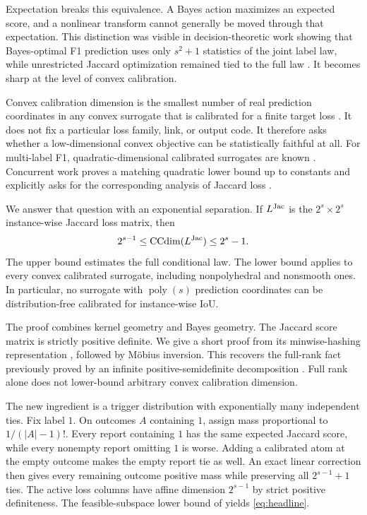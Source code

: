 \documentclass[twoside]{article}
\newcommand{\CCdim}{\operatorname{CCdim}}
\newcommand{\1}{\mathbf 1}
\begin{document}
Expectation breaks this equivalence. A Bayes action maximizes an expected score, and a nonlinear transform cannot generally be moved through that expectation. This distinction was visible in decision-theoretic work showing that Bayes-optimal F1 prediction uses only $s^2+1$ statistics of the joint label law, while unrestricted Jaccard optimization remained tied to the full law \citep{waegeman2014bayes}. It becomes sharp at the level of convex calibration.

Convex calibration dimension is the smallest number of real prediction coordinates in any convex surrogate that is calibrated for a finite target loss \citep{ramaswamy2016convex}. It does not fix a particular loss family, link, or output code. It therefore asks whether a low-dimensional convex objective can be statistically faithful at all. For multi-label F1, quadratic-dimensional calibrated surrogates are known \citep{zhang2020convex}. Concurrent work proves a matching quadratic lower bound up to constants and explicitly asks for the corresponding analysis of Jaccard loss \citep{zhang2026exact}.

We answer that question with an exponential separation. If $L^{\rm Jac}$ is the $2^s\times2^s$ instance-wise Jaccard loss matrix, then
\begin{equation}
2^{s-1}\leq\CCdim(L^{\rm Jac})\leq2^s-1.
\label{eq:headline}
\end{equation}
The upper bound estimates the full conditional law. The lower bound applies to every convex calibrated surrogate, including nonpolyhedral and nonsmooth ones. In particular, no surrogate with $\operatorname{poly}(s)$ prediction coordinates can be distribution-free calibrated for instance-wise IoU.

The proof combines kernel geometry and Bayes geometry. The Jaccard score matrix is strictly positive definite. We give a short proof from its minwise-hashing representation \citep{broder1997resemblance}, followed by M\"obius inversion. This recovers the full-rank fact previously proved by an infinite positive-semidefinite decomposition \citep{bouchard2013proof}. Full rank alone does not lower-bound arbitrary convex calibration dimension.

The new ingredient is a trigger distribution with exponentially many independent ties. Fix label $1$. On outcomes $A$ containing $1$, assign mass proportional to $1/(|A|-1)!$. Every report containing $1$ has the same expected Jaccard score, while every nonempty report omitting $1$ is worse. Adding a calibrated atom at the empty outcome makes the empty report tie as well. An exact linear correction then gives every remaining outcome positive mass while preserving all $2^{s-1}+1$ ties. The active loss columns have affine dimension $2^{s-1}$ by strict positive definiteness. The feasible-subspace lower bound of \citet{ramaswamy2016convex} yields \eqref{eq:headline}.
\end{document}
